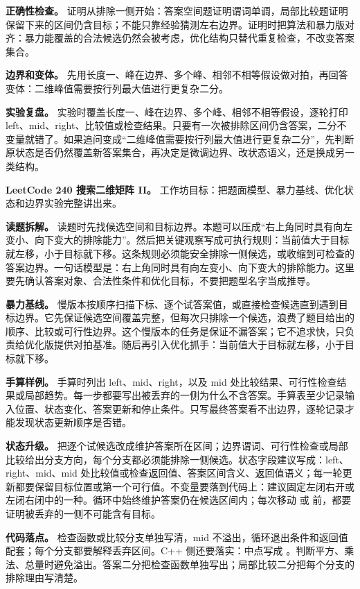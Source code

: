 \textbf{正确性检查。} 证明从排除一侧开始：答案空间题证明谓词单调，局部比较题证明保留下来的区间仍含目标；不能只靠经验猜测左右边界。证明时把算法和暴力版对齐：暴力能覆盖的合法候选仍然会被考虑，优化结构只替代重复检查，不改变答案集合。

\textbf{边界和变体。} 先用长度一、峰在边界、多个峰、相邻不相等假设做对拍，再回答变体：二维峰值需要按行列最大值进行更复杂二分。

\textbf{实验复盘。} 实验时覆盖长度一、峰在边界、多个峰、相邻不相等假设，逐轮打印 left、mid、right、比较值或检查结果。只要有一次被排除区间仍含答案，二分不变量就错了。如果追问变成“二维峰值需要按行列最大值进行更复杂二分”，先判断原状态是否仍然覆盖新答案集合，再决定是微调边界、改状态语义，还是换成另一类结构。

\noindent\textbf{LeetCode 240 搜索二维矩阵 II。} 工作坊目标：把题面模型、暴力基线、优化状态和边界实验完整讲出来。

\textbf{读题拆解。} 读题时先找候选空间和目标边界。本题可以压成“右上角同时具有向左变小、向下变大的排除能力”。然后把关键观察写成可执行规则：当前值大于目标就左移，小于目标就下移。这条规则必须能安全排除一侧候选，或收缩到可检查的答案边界。一句话模型是：右上角同时具有向左变小、向下变大的排除能力。这里要先确认答案对象、合法性条件和优化目标，不要把题型名字当成推导。

\textbf{暴力基线。} 慢版本按顺序扫描下标、逐个试答案值，或直接检查候选直到遇到目标边界。它先保证候选空间覆盖完整，但每次只排除一个候选，浪费了题目给出的顺序、比较或可行性边界。这个慢版本的任务是保证不漏答案；它不追求快，只负责给优化版提供对拍基准。随后再引入优化抓手：当前值大于目标就左移，小于目标就下移。

\textbf{手算样例。} 手算时列出 left、mid、right，以及 mid 处比较结果、可行性检查结果或局部趋势。每一步都要写出被丢弃的一侧为什么不含答案。手算表至少记录输入位置、状态变化、答案更新和停止条件。只写最终答案看不出边界，逐轮记录才能发现状态更新顺序是否错。

\textbf{状态升级。} 把逐个试候选改成维护答案所在区间；边界谓词、可行性检查或局部比较给出分支方向，每个分支都必须能排除一侧候选。状态字段建议写成：left、right、mid、mid 处比较值或检查返回值、答案区间含义、返回值语义；每一轮更新都要保留目标位置或第一个可行值。不变量要落到代码上：建议固定左闭右开或左闭右闭中的一种。循环中始终维护答案仍在候选区间内；每次移动  或  前，都要证明被丢弃的一侧不可能含有目标。

\textbf{代码落点。} 检查函数或比较分支单独写清，mid 不溢出，循环退出条件和返回值配套；每个分支都要解释丢弃区间。C++ 侧还要落实：中点写成 。判断平方、乘法、总量时避免溢出。答案二分把检查函数单独写出；局部比较二分把每个分支的排除理由写清楚。

